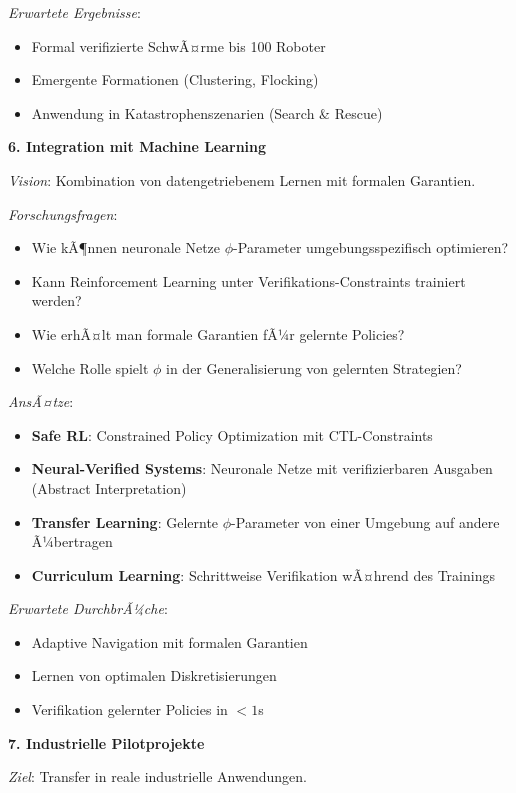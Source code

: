 ﻿\documentclass[a4paper,12pt]{article}
\theoremstyle{definition}
\begin{document}
\textit{Erwartete Ergebnisse}:
\begin{itemize}
	\item Formal verifizierte SchwÃ¤rme bis 100 Roboter
	\item Emergente Formationen (Clustering, Flocking)
	\item Anwendung in Katastrophenszenarien (Search \& Rescue)
\end{itemize}

\textbf{6. Integration mit Machine Learning}

\textit{Vision}: Kombination von datengetriebenem Lernen mit formalen Garantien.

\textit{Forschungsfragen}:
\begin{itemize}
	\item Wie kÃ¶nnen neuronale Netze $\phi$-Parameter umgebungsspezifisch optimieren?
	\item Kann Reinforcement Learning unter Verifikations-Constraints trainiert werden?
	\item Wie erhÃ¤lt man formale Garantien fÃ¼r gelernte Policies?
	\item Welche Rolle spielt $\phi$ in der Generalisierung von gelernten Strategien?
\end{itemize}

\textit{AnsÃ¤tze}:
\begin{itemize}
	\item \textbf{Safe RL}: Constrained Policy Optimization mit CTL-Constraints
	\item \textbf{Neural-Verified Systems}: Neuronale Netze mit verifizierbaren Ausgaben (Abstract Interpretation)
	\item \textbf{Transfer Learning}: Gelernte $\phi$-Parameter von einer Umgebung auf andere Ã¼bertragen
	\item \textbf{Curriculum Learning}: Schrittweise Verifikation wÃ¤hrend des Trainings
\end{itemize}

\textit{Erwartete DurchbrÃ¼che}:
\begin{itemize}
	\item Adaptive Navigation mit formalen Garantien
	\item Lernen von optimalen Diskretisierungen
	\item Verifikation gelernter Policies in $< 1$s
\end{itemize}

\textbf{7. Industrielle Pilotprojekte}

\textit{Ziel}: Transfer in reale industrielle Anwendungen.
\end{document}
